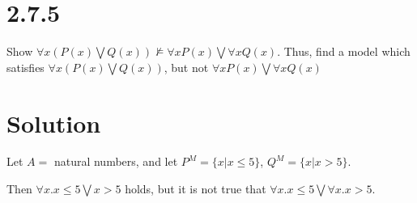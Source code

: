 \documentclass[10pt]{article}
\begin{document}
\section*{2.7.5}
Show $\forall x (P(x) \bigvee Q(x)) \not \models \forall x P(x) \bigvee \forall x Q(x)$. Thus, find a model which satisfies $\forall x (P(x) \bigvee Q(x))$, but not $\forall x P(x) \bigvee \forall x Q(x)$
\section*{Solution} 
\begin{itemize*}
\item Let $A =$ natural numbers, and let $P^{M} = \{ x | x \leq 5 \}$, $Q^{M} = \{ x | x > 5 \}$.
\end{itemize*}
Then $\forall x. x \leq 5 \bigvee x > 5 $ holds, but it is not true that $\forall x. x \leq 5 \bigvee \forall x. x > 5 $.
\end{document}
